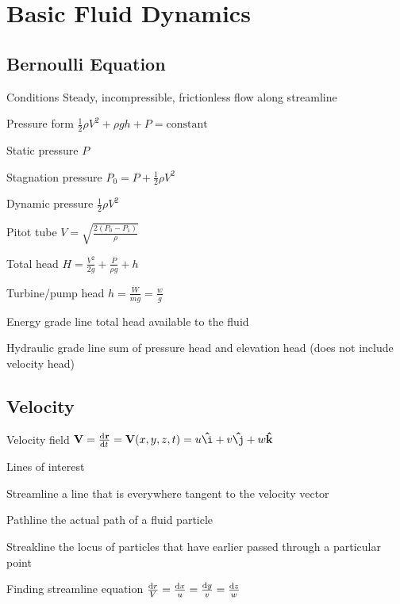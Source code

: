 \documentclass{article}
\begin{document}
\section{Basic Fluid Dynamics}

\subsection{Bernoulli Equation}
\label{sec:bernoulli-eq}
\begin{description*}
\item[Conditions] Steady, incompressible, frictionless flow along streamline
\item[Pressure form]
  \(\frac{1}{2}\rho V^2 + \rho g h + P = \text{constant}\)
\item[Static pressure]
  \(P\)
\item[Stagnation pressure]
  \(P_0 = P + \frac{1}{2}\rho V^2\)
\item[Dynamic pressure]
  \(\frac{1}{2}\rho V^2\)
\item[Pitot tube]
  \(V = \sqrt{\frac{2\left(P_0-P_1\right)}{\rho}}\)
\item[Total head]
  \(H = \frac{V^2}{2g} + \frac{P}{\rho g} + h\)
\item[Turbine\slash{}pump head]
  \(h = \frac{\dot{W}}{\dot{m} g} = \frac{w}{g}\)
\item[Energy grade line] total head available to the fluid
\item[Hydraulic grade line] sum of pressure head and elevation head (does not include velocity head)
\end{description*}

\subsection{Velocity}
\begin{description*}
\item[Velocity field]
  \(\vec{V} = \od{\vec{r}}{t} = \vec{V}(x,y,z,t) = u\uvec{\i}+v\uvec{\j} + w\uvec{k}\)
\item[Lines of interest]~
  \begin{description*}
  \item[Streamline] a line that is everywhere tangent to the velocity vector
  \item[Pathline] the actual path of a fluid particle
  \item[Streakline] the locus of particles that have earlier passed through a particular point
  \end{description*}
\item[Finding streamline equation]
  \(\frac{\dif r}{V} = \frac{\dif x}{u} = \frac{\dif y}{v} = \frac{\dif z}{w}\)
\end{description*}
\end{document}
